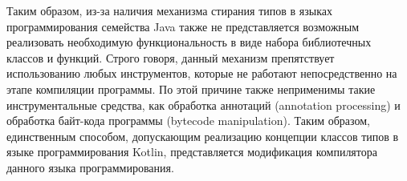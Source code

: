 Таким образом, из-за наличия механизма стирания типов в языках программирования семейства Java также не представляется возможным реализовать необходимую функциональность в виде набора библиотечных классов и функций. Строго говоря, данный механизм препятствует использованию любых инструментов, которые не работают непосредственно на этапе компиляции программы. По этой причине также неприменимы такие инструментальные средства, как обработка аннотаций (annotation processing) и обработка байт-кода программы (bytecode manipulation). Таким образом, единственным способом, допускающим реализацию концепции классов типов в языке программирования Kotlin, представляется модификация компилятора данного языка программирования. 